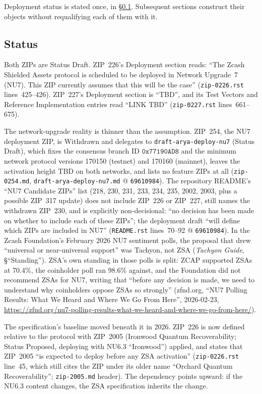 \documentclass[11pt,a4paper]{article}
\theoremstyle{definition}
\begin{document}
Deployment status is stated once, in \S\ref{sec:zsa-status}. Subsequent
sections construct their objects without requalifying each of them with it.

\subsection{Status}\label{sec:zsa-status}

Both ZIPs are Status Draft. ZIP~226's Deployment section reads: ``The Zcash
Shielded Assets protocol is scheduled to be deployed in Network Upgrade~7
(NU7). This ZIP currently assumes that this will be the case''
(\texttt{zip-0226.rst} lines~425--426). ZIP~227's Deployment section is
``TBD'', and its Test Vectors and Reference Implementation entries read ``LINK
TBD'' (\texttt{zip-0227.rst} lines~661--675).

The network-upgrade reality is thinner than the assumption. ZIP~254, the NU7
deployment ZIP, is Withdrawn and delegates to \texttt{draft-arya-deploy-nu7}
(Status Draft), which fixes the consensus branch ID $\mathtt{0x77190AD8}$ and
the minimum network protocol versions 170150 (testnet) and 170160 (mainnet),
leaves the activation height TBD on both networks, and lists no feature ZIPs
at all (\texttt{zip-0254.md}, \texttt{draft-arya-deploy-nu7.md} @
\texttt{69610984}). The repository README's ``NU7 Candidate ZIPs'' list
(218, 230, 231, 233, 234, 235, 2002, 2003, plus a possible ZIP~317 update)
does not include ZIP~226 or ZIP~227, still names the withdrawn ZIP~230, and is
explicitly non-decisional: ``no decision has been made on whether to include
each of these ZIPs''; the deployment draft ``will define which ZIPs are
included in NU7'' (\texttt{README.rst} lines~70--92 @ \texttt{69610984}). In
the Zcash Foundation's February 2026 NU7 sentiment polls, the proposal that
drew ``universal or near-universal support'' was Tachyon, not ZSA
(\emph{Tachyon Guide}, \S``Standing''). ZSA's own standing in those polls is
split: ZCAP supported ZSAs at 70.4\%, the coinholder poll ran 98.6\%
against, and the Foundation did not recommend ZSAs for NU7, writing that
``before any decision is made, we need to understand why coinholders oppose
ZSAs so strongly'' (zfnd.org, ``NU7 Polling Results: What We Heard and Where
We Go From Here'', 2026-02-23,
\url{https://zfnd.org/nu7-polling-results-what-we-heard-and-where-we-go-from-here/}).

The specification's baseline moved beneath it in 2026. ZIP~226 is now defined
relative to the protocol with ZIP~2005 (Ironwood Quantum Recoverability;
Status Proposed, deploying with NU6.3 ``Ironwood'') applied, and states that
ZIP~2005 ``is expected to deploy before any ZSA activation''
(\texttt{zip-0226.rst} line~45, which still cites the ZIP under its older
name ``Orchard Quantum Recoverability''; \texttt{zip-2005.md} header). The dependency points upward: if the
NU6.3 content changes, the ZSA specification inherits the change.
\end{document}
